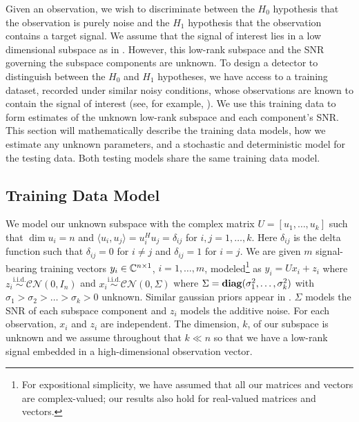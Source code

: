 Given an observation, we wish to discriminate between the $H_0$ hypothesis that the observation is purely noise and the $H_1$ hypothesis that the observation contains a target signal. We assume that the signal of interest lies in a low dimensional subspace as in \cite{besson2005matched,besson2006cfar,bandiera2007adaptive,bandiera2007glrt,maris2003resampling,soong1995principal,thai2002invariant, healey1999models,kwon2006kernel}. However, this low-rank subspace and the SNR governing the subspace components are unknown. To design a detector to distinguish between the $H_0$ and $H_1$ hypotheses, we have access to a training dataset, recorded under similar noisy conditions, whose observations are known to contain the signal of interest (see, for example, \cite{healey1999models,kwon2006kernel}). We use this training data to form estimates of the unknown low-rank subspace and each component's SNR. This section will mathematically describe the training data models, how we estimate any unknown parameters, and a stochastic and deterministic model for the testing data. Both testing models share the same training data model.

\subsection{Training Data Model}\label{sec:ieee_msd_training_data}

We model our unknown subspace with the complex matrix $U=[u_1,\dots,u_k]$ such that $\dim u_i = n$ and $\langle u_i, u_j\rangle = u_i^Hu_j=\delta_{ij}$ for $i,j=1,\dots,k$. Here $\delta_{ij}$ is the delta function such that $\delta_{ij} = 0$ for $i\neq j$ and $\delta_{ij}=1$ for $i=j$. We are given $m$ signal-bearing training vectors $y_i\in \mathbb{C}^{n\times 1}$, $i=1,\dots,m$, modeled\footnote{For expositional simplicity, we have assumed that all our matrices and vectors are complex-valued; our results also hold for real-valued matrices and vectors.} as $y_i=Ux_i+z_i$ where $z_i\overset{\text{i.i.d.}}{\sim}\mathcal{CN}(0,I_n)$ and $x_i\overset{\text{i.i.d.}}{\sim}\mathcal{CN}(0,\Sigma)$ where $\Sigma=\mathop{\bf diag}(\sigma_1^2,\dots,\sigma_k^2)$ with $\sigma_1>\sigma_2>\dots>\sigma_k>0$ unknown. Similar gaussian priors appear in \cite{bandiera2007adaptive,bandiera2007glrt,thai2002invariant, healey1999models}. $\Sigma$ models the SNR of each subspace component and $z_i$ models the additive noise. For each observation, $x_i$ and $z_i$ are independent. The dimension, $k$, of our subspace is unknown and we assume throughout that $k\ll n$ so that we have a low-rank signal embedded in a high-dimensional observation vector.

